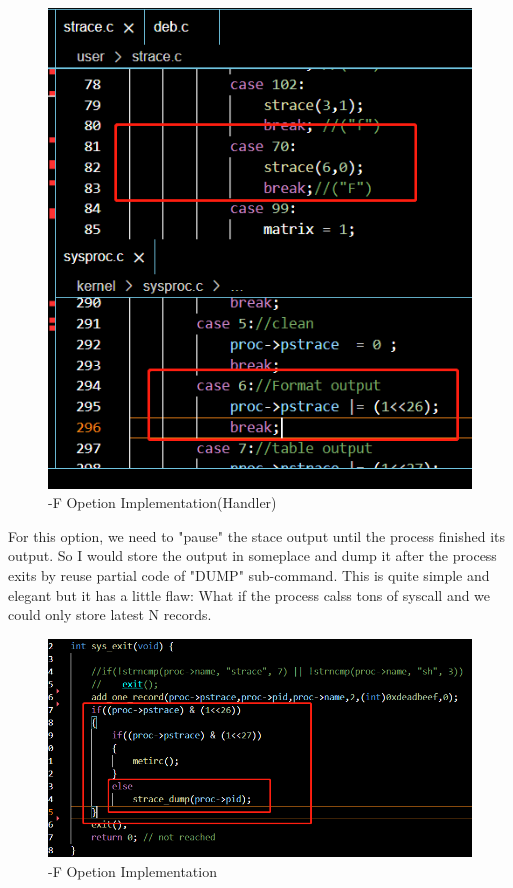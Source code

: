 \documentclass[11pt,oneside,a4paper]{article}
\begin{document}
\begin{figure}[H]
    \includegraphics[width=4.75in]{1-27.png}
    \centering
    \caption{-F Opetion Implementation(Handler)}
\end{figure}

For this option, we need to "pause" the stace output until the process finished its output.
So I would store the output in someplace and dump it after the process exits by reuse partial 
code of "DUMP" sub-command. This is quite simple and elegant but it has a little flaw: What if
the process calss tons of syscall and we could only store latest N records. 

\begin{figure}[H]
    \includegraphics[width=4.75in]{1-24.png}
    \centering
    \caption{-F Opetion Implementation}
\end{figure}
\end{document}
